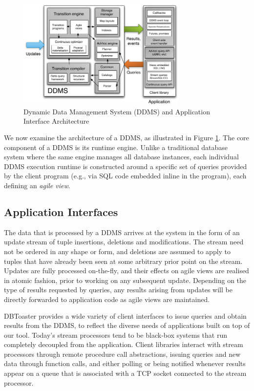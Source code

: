 \begin{figure}
\begin{center}
\includegraphics[width=3.3in]{graphics/CIDRarch.pdf}
\end{center}
\vspace*{-0.2in}
\caption{Dynamic Data Management System (DDMS) and Application Interface
Architecture}
\label{fig:ddmsarch}
\vspace*{-0.2in}
\end{figure}

We now examine the architecture of a DDMS, as illustrated in Figure
\ref{fig:ddmsarch}.  The core component of a DDMS is its runtime engine.  Unlike
a traditional database system where the same engine manages all database
instances, each individual DDMS execution runtime is constructed around a
specific set of queries provided by the client program (e.g., via SQL code
embedded inline in the program), each defining an \textit{agile view}.

\subsection{Application Interfaces}

The data that is processed by a DDMS arrives at the system in the form of an
update stream of tuple insertions, deletions and modifications. The stream need
not be ordered in any shape or form, and deletions are assumed to apply to
tuples that have already been seen at some arbitrary prior point on the stream.
Updates are fully processed on-the-fly, and their effects on agile views are
realised in atomic fashion, prior to working on any subsequent update. Depending
on the type of results requested by queries, any results arising from updates
will be directly forwarded to application code as agile views are maintained.

DBToaster provides a wide variety of client interfaces to issue queries and
obtain results from the DDMS, to reflect the diverse needs of applications built
on top of our tool. Today's stream processors tend to be black-box systems that
run completely decoupled from the application. Client libraries interact with
stream processors through remote procedure call abstractions, issuing queries
and new data through function calls, and either polling or being notified
whenever results appear on a queue that is associated with a TCP socket
connected to the stream processor.

